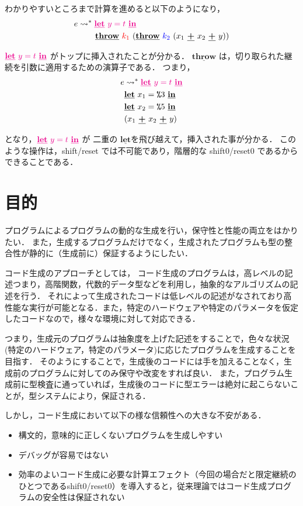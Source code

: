 \documentclass[T]{compsoft}
\newcommand\too{\leadsto^*}
\newcommand\red[1]{\textcolor{red}{#1}}
\newcommand\magenta[1]{\textcolor{magenta}{#1}}
\newcommand\blue[1]{\textcolor{blue}{#1}}
\newcommand\cThrow{\underline{\textbf{throw}}}
\newcommand\cPlus{\underline{\textbf{+}}}
\newcommand\cLet{\underline{\textbf{let}}}
\newcommand\cIn{\underline{\textbf{in}}}
\newcommand\csp[1]{\texttt{\%}{#1}}
\theoremstyle{break}
\begin{document}
わかりやすいところまで計算を進めると以下のようになり，
\begin{align*}
  e & \too \magenta{\cLet~y=t~\cIn} \\
    & \phantom{\too}~~ \cThrow~\red{k_1}~(\cThrow~\blue{k_2}~(x_1~\cPlus~x_2~\cPlus~y))
\end{align*}

$\magenta{\cLet~y=t~\cIn}$ がトップに挿入されたことが分かる．
$\cThrow$ は，切り取られた継続を引数に適用するための演算子である．
つまり，
\begin{align*}
  e & \too \magenta{\cLet~y=t~\cIn} \\
    & \cLet~x_1=\csp{3}~\cIn \\
    & \cLet~x_2=\csp{5}~\cIn \\
    & (x_1~\cPlus~x_2~\cPlus~y)
\end{align*}

となり，$\magenta{\cLet~y=t~\cIn}$ が 二重の $\cLet$を飛び越えて，挿入された事が分かる．
このような操作は，shift/reset では不可能であり，階層的な shift0/reset0 であるからできることである．

\section{目的}
プログラムによるプログラムの動的な生成を行い，保守性と性能の両立をはかりたい．
また，生成するプログラムだけでなく，生成されたプログラムも型の整合性が静的に（生成前に）保証するようにしたい．

コード生成のアプローチとしては，
コード生成のプログラムは，高レベルの記述つまり，高階関数，代数的データ型などを利用し，抽象的なアルゴリズムの記述を行う．
それによって生成されたコードは低レベルの記述がなされており高性能な実行が可能となる．また，特定のハードウェアや特定のパラメータを仮定したコードなので，様々な環境に対して対応できる．

つまり，生成元のプログラムは抽象度を上げた記述をすることで，色々な状況(特定のハードウェア，特定のパラメータ)に応じたプログラムを生成することを目指す．
そのようにすることで，生成後のコードには手を加えることなく，生成前のプログラムに対してのみ保守や改変をすれば良い．
また，プログラム生成前に型検査に通っていれば，生成後のコードに型エラーは絶対に起こらないことが，型システムにより，保証される．

しかし，コード生成において以下の様な信頼性への大きな不安がある．

\begin{itemize}
\item 構文的，意味的に正しくないプログラムを生成しやすい
\item デバッグが容易ではない
\item 効率のよいコード生成に必要な計算エフェクト（今回の場合だと限定継続のひとつであるshift0/reset0）を導入すると，従来理論ではコード生成プログラムの安全性は保証されない
\end{itemize}
\end{document}
